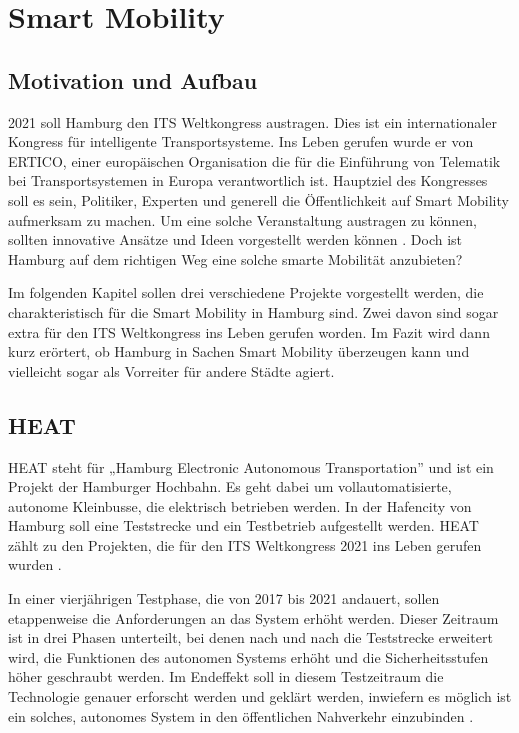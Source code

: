 \section{Smart Mobility}
\label{sec:smart_mobility}

\subsection{Motivation und Aufbau}

2021 soll Hamburg den ITS Weltkongress austragen. Dies ist ein internationaler Kongress für intelligente Transportsysteme.
Ins Leben gerufen wurde er von ERTICO, einer europäischen Organisation die für die Einführung von Telematik bei Transportsystemen in Europa verantwortlich ist.
Hauptziel des Kongresses soll es sein, Politiker, Experten und generell die Öffentlichkeit auf Smart Mobility aufmerksam zu machen.
Um eine solche Veranstaltung austragen zu können, sollten innovative Ansätze und Ideen vorgestellt werden können \autocite[vgl.][]{ITSWorldCongress.2020}.
Doch ist Hamburg auf dem richtigen Weg eine solche smarte Mobilität anzubieten?

Im folgenden Kapitel sollen drei verschiedene Projekte vorgestellt werden, die charakteristisch für die Smart Mobility in Hamburg sind.
Zwei davon sind sogar extra für den ITS Weltkongress ins Leben gerufen worden.
Im Fazit wird dann kurz erörtert, ob Hamburg in Sachen Smart Mobility überzeugen kann und vielleicht sogar als Vorreiter für andere Städte agiert. 

\subsection{HEAT}

HEAT steht für „Hamburg Electronic Autonomous Transportation” und ist ein Projekt der Hamburger Hochbahn.
Es geht dabei um vollautomatisierte, autonome Kleinbusse, die elektrisch betrieben werden. In der Hafencity von Hamburg soll eine Teststrecke und ein Testbetrieb aufgestellt werden. HEAT zählt zu den Projekten, die für den ITS Weltkongress 2021 ins Leben gerufen wurden \autocite[vgl.][]{SmartCityKompass.2020c}.

In einer vierjährigen Testphase, die von 2017 bis 2021 andauert, sollen etappenweise die Anforderungen an das System erhöht werden.
Dieser Zeitraum ist in drei Phasen unterteilt, bei denen nach und nach die Teststrecke erweitert wird, die Funktionen des autonomen Systems erhöht und die Sicherheitsstufen höher geschraubt werden.
Im Endeffekt soll in diesem Testzeitraum die Technologie genauer erforscht werden und geklärt werden, inwiefern es möglich ist ein solches, autonomes System in den öffentlichen Nahverkehr einzubinden \autocite[vgl.][]{HOCHBAHN.2020}.

